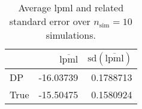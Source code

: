 \begin{table}[H]

\caption{Average lpml and related standard error over $n_{\text{sim}} = 10$ simulations.}
\centering
\begin{tabular}[t]{lrr}
\toprule
  & $\overbar{\text{lpml}}$ & $\text{sd}(\overbar{\text{lpml}})$\\
\midrule
DP & -16.03739 & 0.1788713\\
True & -15.50475 & 0.1580924\\
\bottomrule
\end{tabular}
\end{table}